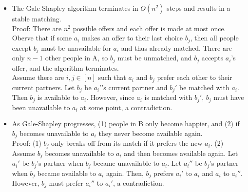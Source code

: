 \documentclass{article}
\begin{document}
\begin{itemize}
    \item The Gale-Shapley algorithm terminates in $O(n^2)$ steps and results in a stable matching. \\[0.5ex]
    Proof: There are $n^2$ possible offers and each offer is made at most once. \\[0.25ex]
    Oberve that if some $a_i$ makes an offer to their last choice $b_j$, then all people except $b_j$ must be unavailable for $a_i$ and thus already matched. There are only $n - 1$ other people in A, so $b_j$ must be unmatched, and $b_j$ accepts $a_i$'s offer, and the algorithm terminates. \\[0.25ex] 
    Assume there are $i,j \in [n]$ such that $a_i$ and $b_j$ prefer each other to their current partners. Let $b_j$ be $a_i'$'s current partner and $b_j'$ be matched with $a_i$. Then $b_j$ is available to $a_i$. However, since $a_i$ is matched with $b_j'$, $b_j$ must have been unavailable to $a_i$ at some point, a contradiction.
    \item As Gale-Shapley progresses, (1) people in B only become happier, and (2) if $b_j$ becomes unavailable to $a_i$ they never become available again. \\[0.5ex]
    Proof: (1) $b_j$ only breaks off from its match if it prefers the new $a_i$.
    (2) Assume $b_j$ becomes unavailable to $a_i$ and then becomes available again. Let $a_i'$ be $b_j$'s partner when $b_j$ became unavailable to $a_i$. Let $a_i''$ be $b_j$'s partner when $b_j$ became available to $a_i$ again. Then, $b_j$ prefers $a_i'$ to $a_i$ and $a_i$ to $a_i''$. However, $b_j$ must prefer $a_i''$ to $a_i'$, a contradiction. 
\end{itemize}

\end{document}
